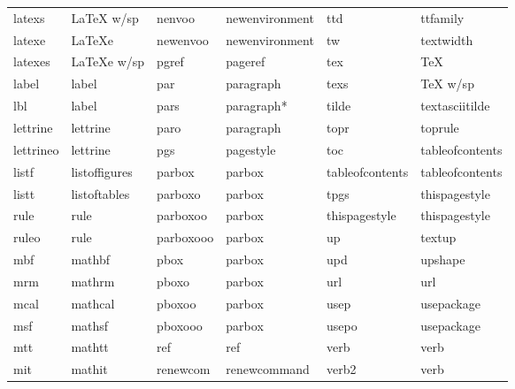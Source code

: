\documentclass[11pt]{article}
\begin{document}
\begin{table}[!h]
{\begin{tabular}{llllll}
latexs           & LaTeX w/sp        & nenvoo     & newenvironment & ttd             & ttfamily \\
latexe           & LaTeXe            & newenvoo   & newenvironment & tw              & textwidth \\
latexes          & LaTeXe w/sp       & pgref      & pageref        & tex             & TeX \\
label            & label             & par        & paragraph      & texs            & TeX w/sp \\
lbl              & label             & pars       & paragraph*     & tilde           & textasciitilde \\
lettrine         & lettrine          & paro       & paragraph      & topr            & toprule \\
lettrineo        & lettrine          & pgs        & pagestyle      & toc             & tableofcontents \\
listf            & listoffigures     & parbox     & parbox         & tableofcontents & tableofcontents \\
listt            & listoftables      & parboxo    & parbox         & tpgs            & thispagestyle \\
rule             & rule              & parboxoo   & parbox         & thispagestyle   & thispagestyle \\
ruleo            & rule              & parboxooo  & parbox         & up              & textup \\
mbf              & mathbf            & pbox       & parbox         & upd             & upshape \\
mrm              & mathrm            & pboxo      & parbox         & url             & url \\
mcal             & mathcal           & pboxoo     & parbox         & usep            & usepackage \\
msf              & mathsf            & pboxooo    & parbox         & usepo           & usepackage \\
mtt              & mathtt            & ref        & ref            & verb            & verb \\ 
mit              & mathit            & renewcom   & renewcommand   & verb2           & verb \\
\end{tabular}
}
\end{table}
\end{document}
